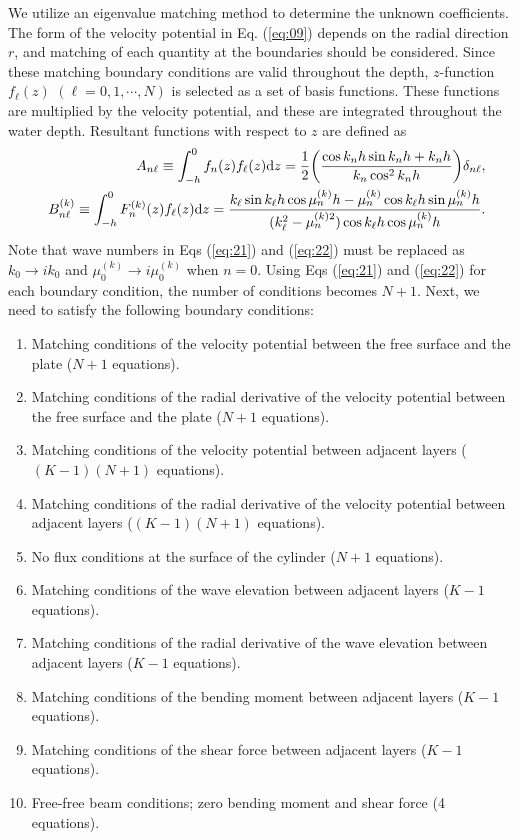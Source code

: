 \documentclass{jfm}
\def\d{\delta}
\def\d{\textrm{d}}
\begin{document}
We utilize an eigenvalue matching method \cite[]{Peter2004} to determine the unknown coefficients. The form of the velocity potential in Eq. (\ref{eq:09}) depends on the radial direction $r$, and matching of each quantity at the boundaries should be considered. Since these matching boundary conditions are valid throughout the depth, $z$-function $f_\ell(z)$ $(\ell=0,1,\cdots,N)$ is selected as a set of basis functions. These functions are multiplied by the velocity potential, and these are integrated throughout the water depth. Resultant functions with respect to $z$ are defined as 
\begin{eqnarray}
\displaystyle &&A_{n\ell} \equiv \int_{-h}^{0} f_n(z) f_\ell(z) \d z =\frac{1}{2}\bigg( \frac{\cos{k_nh}\sin{k_nh}+k_nh}{k_n\cos^2{k_nh}}\bigg)\delta_{n\ell},
\label{eq:21}\\
\displaystyle &&B_{n\ell}^{(k)} \equiv \int_{-h}^{0} F_n^{(k)}(z)f_\ell(z) \d z= \frac{k_\ell\sin{k_\ell h}\cos{\mu_n^{(k)}h}-\mu_n^{(k)}\cos{k_\ell h}\sin{\mu_n^{(k)}h} }{(k_\ell^2-\mu_n^{(k)2})\cos{k_\ell h}\cos{\mu_n^{(k)}h}}.
\label{eq:22}
\end{eqnarray}
Note that wave numbers in Eqs (\ref{eq:21}) and (\ref{eq:22}) must be replaced as $k_0\to ik_0$ and $\mu_0^{(k)}\to i\mu_0^{(k)}$ when $n=0$.
Using Eqs (\ref{eq:21}) and (\ref{eq:22}) for each boundary condition, the number of conditions becomes $N+1$. Next, we need to satisfy the following boundary conditions:
\begin{enumerate}
  \item 
Matching conditions of the velocity potential between the free surface and the plate ($N+1$ equations).
  \item 
Matching conditions of the radial derivative of the velocity potential between the free surface and the plate ($N+1$ equations).
  \item 
Matching conditions of the velocity potential between adjacent layers ($(K-1)(N+1)$ equations).
  \item 
Matching conditions of the radial derivative of the velocity potential between adjacent layers ($(K-1)(N+1)$ equations).
  \item 
No flux conditions at the surface of the cylinder ($N+1$ equations).
  \item 
Matching conditions of the wave elevation between adjacent layers ($K-1$ equations).
  \item 
Matching conditions of the radial derivative of the wave elevation between adjacent layers ($K-1$ equations).
  \item 
Matching conditions of the bending moment between adjacent layers ($K-1$ equations).
  \item 
Matching conditions of the shear force between adjacent layers ($K-1$ equations).
  \item 
Free-free beam conditions; zero bending moment and shear force (4 equations).
\end{enumerate}
\end{document}
